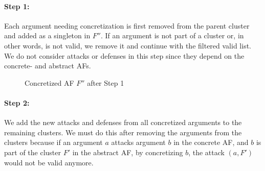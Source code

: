 \vspace{-0.2cm}

\paragraph{Step 1:} Each argument needing concretization is first removed from the parent cluster and added as a singleton in $F''$. 
If an argument is not part of a cluster or, in other words, is not valid, we remove it and continue with the filtered valid list.
We do not consider attacks or defenses in this step since they depend on the concrete- and abstract AFs.


\vspace{0.4cm}
\begin{figure}[h]
    \centering
    \caption{Concretized AF $F''$ after Step 1}
\end{figure}

\vspace{-0.2cm}
\paragraph{Step 2:} We add the new attacks and defenses from all concretized arguments to the remaining clusters. We must do this after
removing the arguments from the clusters because if an argument $a$ attacks argument $b$ in the concrete AF, and $b$ is part of the cluster $F'$ in the abstract AF, by concretizing $b$, the attack $(a,F')$ would not be valid anymore.

